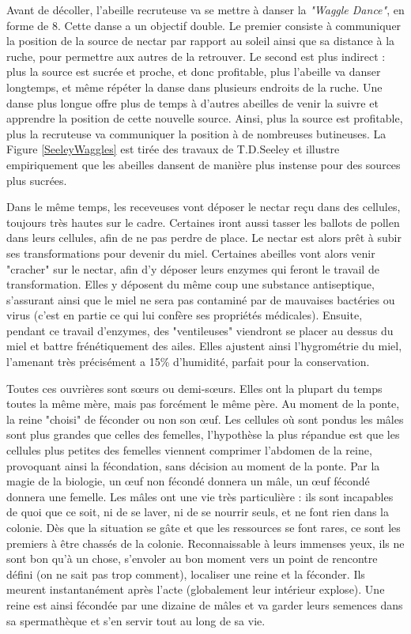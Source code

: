 	Avant de décoller, l'abeille recruteuse va se mettre à danser la \textit{"Waggle Dance"}, en forme de 8. Cette danse a un objectif double. Le premier consiste à communiquer la position de la source de nectar par rapport au soleil ainsi que sa distance à la ruche, pour permettre aux autres de la retrouver. Le second est plus indirect : plus la source est sucrée et proche, et donc profitable, plus l'abeille va danser longtemps, et même répéter la danse dans plusieurs endroits de la ruche. Une danse plus longue offre plus de temps à d'autres abeilles de venir la suivre et apprendre la position de cette nouvelle source. Ainsi, plus la source est profitable, plus la recruteuse va communiquer la position à de nombreuses butineuses. La Figure \ref{SeeleyWaggles} est tirée des travaux de T.D.Seeley \cite{seeley_wisdom_1995} et illustre empiriquement que les abeilles dansent de manière plus instense pour des sources plus sucrées.
			
			Dans le même temps, les receveuses vont déposer le nectar reçu dans des cellules, toujours très hautes sur le cadre. Certaines iront aussi tasser les ballots de pollen dans leurs cellules, afin de ne pas perdre de place. Le nectar est alors prêt à subir ses transformations pour devenir du miel. Certaines abeilles vont alors venir "cracher" sur le nectar, afin d'y déposer leurs enzymes qui feront le travail de transformation. Elles y déposent du même coup une substance antiseptique, s'assurant ainsi que le miel ne sera pas contaminé par de mauvaises bactéries ou virus (c'est en partie ce qui lui confère ses propriétés médicales). Ensuite, pendant ce travail d'enzymes, des "ventileuses" viendront se placer au dessus du miel et battre frénétiquement des ailes. Elles ajustent ainsi l'hygrométrie du miel, l'amenant très précisément a 15\% d'humidité, parfait pour la conservation.
			
			Toutes ces ouvrières sont sœurs ou demi-sœurs. Elles ont la plupart du temps toutes la même mère, mais pas forcément le même père. Au moment de la ponte, la reine "choisi" de féconder ou non son œuf. Les cellules où sont pondus les mâles sont plus grandes que celles des femelles, l'hypothèse la plus répandue est que les cellules plus petites des femelles viennent comprimer l'abdomen de la reine, provoquant ainsi la fécondation, sans décision au moment de la ponte. Par la magie de la biologie, un œuf non fécondé donnera un mâle, un œuf fécondé donnera une femelle. Les mâles ont une vie très particulière : ils sont incapables de quoi que ce soit, ni de se laver, ni de se nourrir seuls, et ne font rien dans la colonie. Dès que la situation se gâte et que les ressources se font rares, ce sont les premiers à être chassés de la colonie. Reconnaissable à leurs immenses yeux, ils ne sont bon qu'à un chose, s'envoler au bon moment vers un point de rencontre défini (on ne sait pas trop comment), localiser une reine et la féconder. Ils meurent instantanément après l'acte (globalement leur intérieur explose). Une reine est ainsi fécondée par une dizaine de mâles et va garder leurs semences dans sa spermathèque et s'en servir tout au long de sa vie.
			

